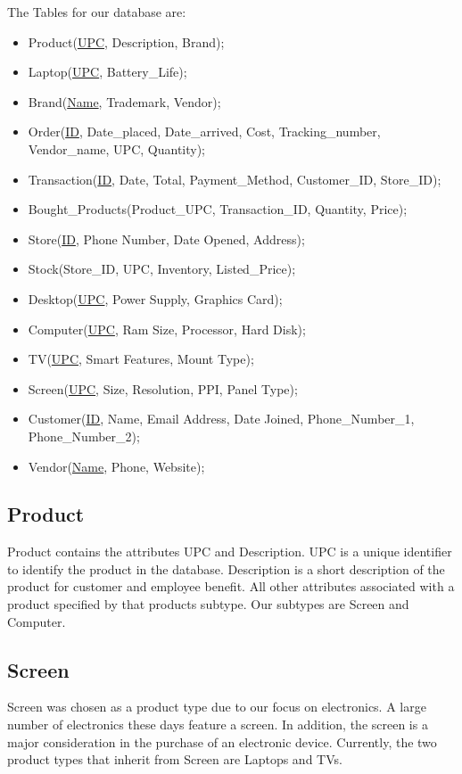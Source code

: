 \documentclass{article}
\begin{document}
		\noindent 
		The Tables for our database are:
		\begin{itemize}
			\item Product(\underline{UPC}, Description, Brand);
			\item Laptop(\underline{UPC}, Battery\_Life);
			\item Brand(\underline{Name}, Trademark, Vendor);
			\item Order(\underline{ID}, Date\_placed, Date\_arrived, Cost, Tracking\_number, Vendor\_name, UPC, Quantity);
			\item Transaction(\underline{ID}, Date, Total, Payment\_Method, Customer\_ID, Store\_ID);
			\item Bought\_Products(Product\_UPC, Transaction\_ID, Quantity, Price);
			\item Store(\underline{ID}, Phone Number, Date Opened, Address);
			\item Stock(Store\_ID, UPC, Inventory, Listed\_Price);
			\item Desktop(\underline{UPC}, Power Supply, Graphics Card);
			\item Computer(\underline{UPC}, Ram Size, Processor, Hard Disk);
			\item TV(\underline{UPC}, Smart Features, Mount Type);
			\item Screen(\underline{UPC}, Size, Resolution, PPI, Panel Type);
			\item Customer(\underline{ID}, Name, Email Address, Date Joined, Phone\_Number\_1, Phone\_Number\_2);
			\item Vendor(\underline{Name}, Phone, Website);
		\end{itemize}

		\subsection{Product}
			Product contains the attributes UPC and Description. UPC is a unique
			identifier to identify the product in the database. Description is a short
			description of the product for customer and employee benefit. All other
			attributes associated with a product specified by that products subtype.
			Our subtypes are Screen and Computer.

		\subsection{Screen}
			Screen was chosen as a product type due to our focus on electronics.  A
			large number of electronics these days feature a screen. In addition, the
			screen is a major consideration in the purchase of an electronic device.
			Currently, the two product types that inherit from Screen are Laptops and
			TVs.
\end{document}
